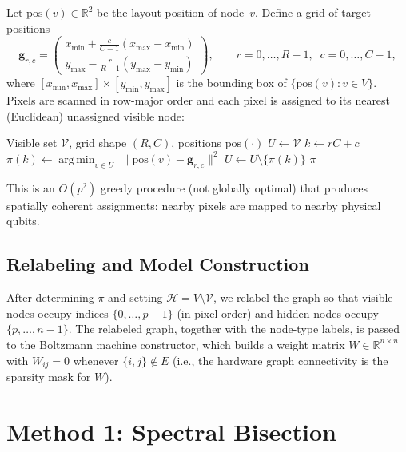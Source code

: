 \documentclass[11pt,a4paper]{article}
\DeclareMathOperator*{\argmin}{arg\,min}
\newcommand{\VV}{\mathcal{V}}
\newcommand{\HH}{\mathcal{H}}
\newcommand{\RR}{\mathbb{R}}
\begin{document}
Let $\mathrm{pos}(v) \in \RR^2$ be the layout position of node~$v$.  Define a grid of target positions
\[
  \mathbf{g}_{r,c} = 
  \begin{pmatrix}
    x_{\min} + \frac{c}{C-1}(x_{\max}-x_{\min}) \\[4pt]
    y_{\max} - \frac{r}{R-1}(y_{\max}-y_{\min})
  \end{pmatrix},
  \qquad r=0,\ldots,R{-}1,\;\; c=0,\ldots,C{-}1,
\]
where $[x_{\min},x_{\max}]\times [y_{\min},y_{\max}]$ is the bounding box of $\{\mathrm{pos}(v) : v\in V\}$.  Pixels are scanned in row-major order and each pixel is assigned to its nearest (Euclidean) unassigned visible node:

\begin{algorithm}[H]
\caption{Greedy Spatial Pixel Assignment}\label{alg:pixel}
\begin{algorithmic}[1]
\Require Visible set $\VV$, grid shape $(R,C)$, positions $\mathrm{pos}(\cdot)$
\State $U \gets \VV$ 
  \State $k \gets rC + c$
  \State $\pi(k) \gets \argmin_{v \in U}\; \|\mathrm{pos}(v) - \mathbf{g}_{r,c}\|^2$
  \State $U \gets U \setminus \{\pi(k)\}$
\EndFor
\State \Return $\pi$
\end{algorithmic}
\end{algorithm}

This is an $O(p^2)$ greedy procedure (not globally optimal) that produces spatially coherent assignments: nearby pixels are mapped to nearby physical qubits.

\subsection{Relabeling and Model Construction}\label{sec:relabel}

After determining $\pi$ and setting $\HH = V \setminus \VV$, we relabel the graph so that visible nodes occupy indices $\{0,\ldots,p-1\}$ (in pixel order) and hidden nodes occupy $\{p,\ldots,n-1\}$.  The relabeled graph, together with the node-type labels, is passed to the Boltzmann machine constructor, which builds a weight matrix $W\in\RR^{n\times n}$ with $W_{ij}=0$ whenever $\{i,j\}\notin E$ (i.e., the hardware graph connectivity is the sparsity mask for $W$).

\section{Method 1: Spectral Bisection}\label{sec:spectral}
\end{document}
